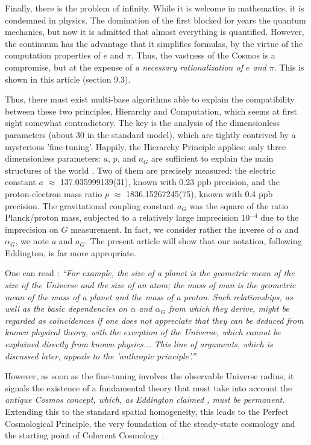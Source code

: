 \documentclass[twoside,draft]{article}
\begin{document}
\begin{sloppypar}
Finally, there is the problem of infinity. While it is welcome in mathematics, it is condemned in physics. The domination of the first blocked for years the quantum mechanics, but now it is admitted that almost everything is quantified. However, the continuum has the advantage that it simplifies formulas, by the virtue of the computation properties of $e$ and $\pi$. Thus, the vastness of the Cosmos is a compromise, but at the expense of \textit{a necessary rationalization of $e$ and $\pi$}. This is shown in this article (section 9.3).

Thus, there must exist multi-base algorithms able to explain the compatibility between these two principles, Hierarchy and Computation, which seems at first sight somewhat contradictory. The key is the analysis of the dimensionless parameters (about 30 in the standard model), which are tightly contrived by a mysterious 'fine-tuning'. Happily, the Hierarchy Principle applies:  only three dimensionless parameters: $a$, $p$, and $a_{G}$ are sufficient to explain the main structures of the world \cite{Carr}. Two of them are precisely measured: the electric constant $a$ $\approx$ 137.035999139(31), known with 0.23 ppb precision, and the proton-electron mass ratio $p$ $\approx$ 1836.15267245(75), known with 0.4 ppb precision. The gravitational coupling constant $a_{G}$ was the square of the ratio Planck/proton mass, subjected to a relatively large imprecision 10$^{-4}\!$ due to the imprecision on $G$ measurement. In fact, we consider rather the inverse of $\alpha$ and $\alpha_G$, we note $a$ and $a_G$. The present article will show that our notation, following Eddington\cite{Eddington}, is far more appropriate.

One can read \cite{Carr}: \textit{“For example, the size of a planet is the geometric mean of the size of the Universe and the size of an atom; the mass of man is the geometric mean of the mass of a planet and the mass of a proton. Such relationships, as well as the basic dependencies on $\alpha$ and $\alpha_G$ from which they derive, might be regarded as coincidences if one does not appreciate that they can be deduced from known physical theory, with the exception of the Universe, which cannot be explained directly from known physics... This line of arguments, which is discussed later, appeals to the 'anthropic principle'.”}

However, as soon as the fine-tuning involves the observable Universe radius, it signals the existence of a fundamental theory that must take into account the \textit{antique Cosmos concept, which, as Eddington claimed \cite{Eddington}, must be permanent}. Extending this to the standard spatial homogeneity, this leads to the Perfect Cosmological Principle, the very foundation of the steady-state cosmology and the starting point of Coherent Cosmology \cite{Sanchez1}.


\end{sloppypar}
\end{document}
